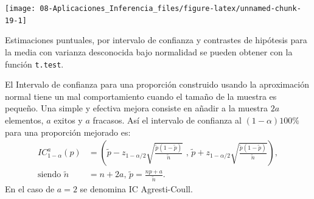 \documentclass[]{book}
\theoremstyle{definition}
\theoremstyle{definition}
\theoremstyle{definition}
\theoremstyle{remark}
\let\BeginKnitrBlock\begin \let\EndKnitrBlock\end
\begin{document}
\begin{center}\texttt{[image: 08-Aplicaciones\_Inferencia\_files/figure-latex/unnamed-chunk-19-1]} \end{center}

\BeginKnitrBlock{remark}
{}Estimaciones puntuales, por intervalo de
confianza y contrastes de hipótesis para la media con varianza
desconocida bajo normalidad se pueden obtener con la función
\texttt{t.test}.
\EndKnitrBlock{remark}

 \vspace{0.5cm}

\BeginKnitrBlock{exercise}
\protect\hypertarget{exr:unnamed-chunk-21}{}{\label{exr:unnamed-chunk-21} }
\EndKnitrBlock{exercise}

El Intervalo de confianza para una proporción construido usando la
aproximación normal tiene un mal comportamiento cuando el tamaño de la
muestra es pequeño. Una simple y efectiva mejora consiste en añadir a la
muestra \(2a\) elementos, \(a\) exitos y \(a\) fracasos. Así el
intervalo de confianza al \(\left( 1-\alpha\right) 100\%\) para una
proporción mejorado es: \[\begin{aligned}
IC_{1-\alpha}^{a}\left(  p\right)   
& =\left(  \tilde{p}-z_{1-\alpha/2}\sqrt{\frac{\tilde{p}(1-\tilde{p})}{\tilde{n}}} \text{ , }
\tilde{p}+z_{1-\alpha/2}\sqrt{\frac{\tilde{p}(1-\tilde{p})}{\tilde{n}}}\right)  ,\\
\text{siendo }\tilde{n} & = n+2a \text{, } \tilde{p} = \frac{np+a}{\tilde{n}}.
\end{aligned}\] En el caso de \(a=2\) se denomina IC Agresti-Coull.
\end{document}
